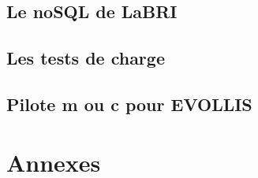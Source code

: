 \documentclass[12pt]{report}
\begin{document}
\chapter{Le noSQL de LaBRI}

\chapter{Les tests de charge}

\chapter{Pilote m ou c pour EVOLLIS}

%



\part{Annexes}
\appendix
\end{document}
